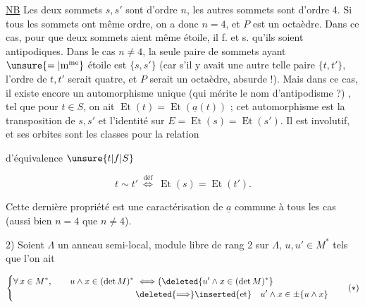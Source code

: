 
\uline{NB} Les deux sommets $s,s'$ sont d'ordre $n$, les autres sommets sont d'ordre 4. Si tous les sommets ont même ordre, on a donc $n=4$, et $P$ est un octaèdre. Dans ce cas, pour que deux sommets aient même étoile, il f. et s. qu'ils soient antipodiques. Dans le cas $n\ne4$, la seule paire de sommets ayant $\unsure{=|\text{m\textsuperscript{me}}}$ étoile est $\{s,s'\}$ (car  s'il y avait une autre  telle paire $\{t,t'\}$,  l'ordre de $t,t'$ serait quatre, et $P$ serait un octaèdre, absurde !). Mais dans ce cas, il existe encore un automorphisme unique (qui mérite le nom d'antipodisme ?) , tel que pour  $t\in S$, on ait $\operatorname{Et}(t)=\operatorname{Et}(\underline a(t))$ ; cet automorphisme est la transposition de $s,s'$ et l'identité sur $E=\operatorname{Et}(s)=\operatorname{Et}(s')$. Il est involutif, et ses orbites sont les classes pour la relation


d'équivalence  $\unsure{t|f|S}$

\[
t\sim t'\ \overset{\mathrm{déf}}{\Longleftrightarrow}\ \operatorname{Et}(s)=\operatorname{Et}(t').
\]

Cette dernière propriété est une caractérisation de $\underline a$ commune à tous les cas (aussi bien $n=4$ que $n\ne4$).

2) Soient $\Lambda$ un anneau semi-local,  module libre de rang 2 sur $\Lambda$, $u,u'\in M^*$ tels que l'on ait

\[
\left\{\begin{aligned}
&\forall\,x\in M^*,\qquad u\wedge x\in(\det M)^*\ \Longleftrightarrow
\bigl(\deleted{u'\wedge x\in(\det M)^*}\\
&\hspace{14em}\deleted{\Longrightarrow}\inserted{\text{et}}\quad u'\wedge x\in\pm\{u\wedge x\}
\end{aligned}\right.\tag*{$(*)$}
\]

